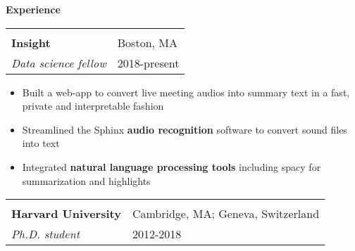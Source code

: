 \documentclass[letterpaper,11pt,oneside]{article}
\newcommand{\crimson}[1]{\textcolor[rgb]{0.67, 0.11, 0.188}{#1}}
\begin{document}
 \vspace{-0.35cm}
 \raggedright
 \textbf{\Large{\crimson{E}xperience}} \sout{\hfill} \\
 \normalsize
\begin{flushleft}
 \vspace{-0.45cm}
 \begin{tabular}{@{} l l }
    \hspace{0.8\linewidth} & \hspace{0.1\linewidth} \\
    \textbf{Insight} & Boston, MA \\ 
    \textit{Data science fellow} & 2018-present \\ 
 \end{tabular}
 \end{flushleft}
 \begin{flushleft}
 \begin{small}
 \begin{itemize}[leftmargin=*]
 \item Built a web-app to convert live meeting audios into summary text in a fast, private and interpretable fashion
 \item Streamlined the Sphinx \textbf{audio recognition} software to convert sound files into text
 \item Integrated \textbf{natural language processing tools} including spacy for summarization and highlights
 \end{itemize}
 \end{small}
 \end{flushleft}
 \begin{flushleft}
 \vspace{-0.25cm}
 \begin{tabular}{@{} l l }
    \hspace{0.6\linewidth} & \hspace{0.2\linewidth} \\
    \textbf{Harvard University} & Cambridge, MA; Geneva, Switzerland \\ 
    \textit{Ph.D. student} & \hspace{0.195\linewidth} 2012-2018 \\ 
 \end{tabular}
 \end{flushleft}
\end{document}
